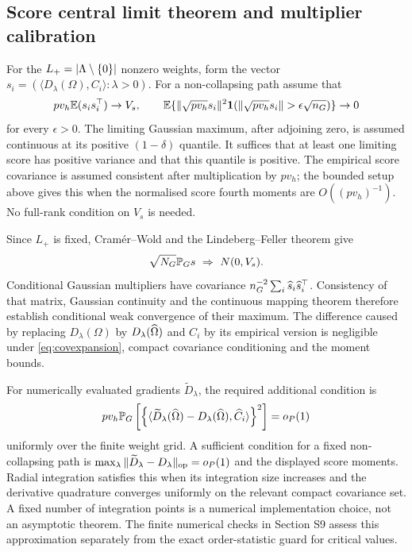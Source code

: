 \subsection{Score central limit theorem and multiplier calibration}
For the $L_+=|\Lambda\setminus\{0\}|$ nonzero weights, form the vector
$s_i=(\langle D_\lambda(\Omega),C_i\rangle:\lambda>0)$.
For a non-collapsing path assume that
\begin{equation}\label{eq:scorecltconditions}
 pv_h\E(s_is_i^\top)\to V_s,\qquad
 \E\{\|\sqrt{pv_h}s_i\|^2\ind(\|\sqrt{pv_h}s_i\|>\epsilon\sqrt{n_G})\}\to0
\end{equation}
for every $\epsilon>0$. The limiting Gaussian maximum, after adjoining zero, is assumed continuous at its positive $(1-\delta)$ quantile. It suffices that at least one limiting score has positive variance and that this quantile is positive. The empirical score covariance is assumed consistent after multiplication by $pv_h$; the bounded setup above gives this when the normalised score fourth moments are $O((pv_h)^{-1})$. No full-rank condition on $V_s$ is needed.

Since $L_+$ is fixed, Cram\'er--Wold and the Lindeberg--Feller theorem give
\[
 \sqrt{N_G}\mathbb P_Gs\ \Rightarrow\ N(0,V_s).
\]
Conditional Gaussian multipliers have covariance $n_G^{-2}\sum_i\widehat s_i\widehat s_i^\top$. Consistency of that matrix, Gaussian continuity and the continuous mapping theorem therefore establish conditional weak convergence of their maximum. The difference caused by replacing $D_\lambda(\Omega)$ by $D_\lambda(\widehat\Omega)$ and $C_i$ by its empirical version is negligible under \eqref{eq:covexpansion}, compact covariance conditioning and the moment bounds.

For numerically evaluated gradients $\widetilde D_\lambda$, the required additional condition is
\begin{equation}\label{eq:numericalgradient}
 pv_h\mathbb P_G\left[
 \left\{\langle\widetilde D_\lambda(\widehat\Omega)-D_\lambda(\widehat\Omega),\widehat C_i\rangle\right\}^2
 \right]=o_P(1)
\end{equation}
uniformly over the finite weight grid. A sufficient condition for a fixed non-collapsing path is $\max_\lambda\|\widetilde D_\lambda-D_\lambda\|_{\mathrm{op}}=o_P(1)$ and the displayed score moments. Radial integration satisfies this when its integration size increases and the derivative quadrature converges uniformly on the relevant compact covariance set. A fixed number of integration points is a numerical implementation choice, not an asymptotic theorem. The finite numerical checks in Section S9 assess this approximation separately from the exact order-statistic guard for critical values.

